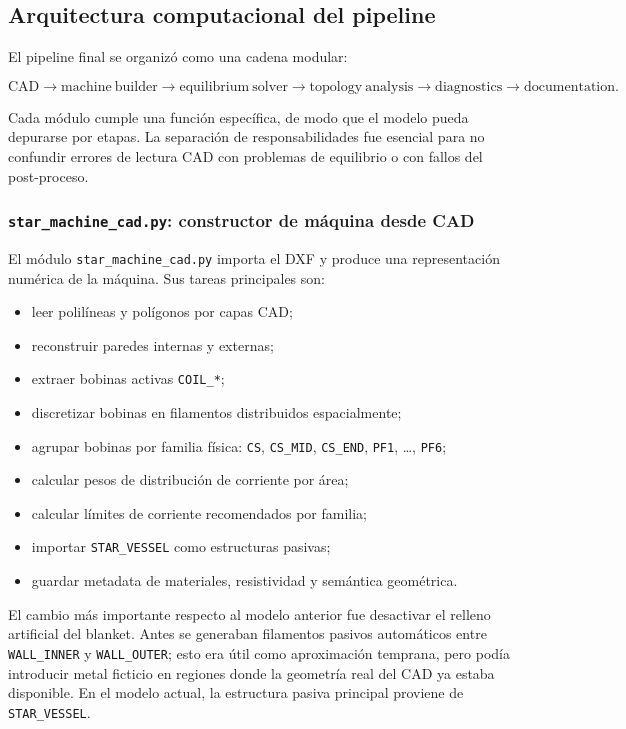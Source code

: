 \documentclass[11pt,a4paper]{article}
\begin{document}
\subsection{Arquitectura computacional del pipeline}
El pipeline final se organizó como una cadena modular:

\[
\mathrm{CAD}\rightarrow
\mathrm{machine\ builder}\rightarrow
\mathrm{equilibrium\ solver}\rightarrow
\mathrm{topology\ analysis}\rightarrow
\mathrm{diagnostics}\rightarrow
\mathrm{documentation}.
\]

Cada módulo cumple una función específica, de modo que el modelo pueda depurarse por etapas.
La separación de responsabilidades fue esencial para no confundir errores de lectura CAD con
problemas de equilibrio o con fallos del post-proceso.

\subsubsection{\texttt{star\_machine\_cad.py}: constructor de máquina desde CAD}
El módulo \texttt{star\_machine\_cad.py} importa el DXF y produce una representación numérica de
la máquina. Sus tareas principales son:

\begin{itemize}
    \item leer polilíneas y polígonos por capas CAD;
    \item reconstruir paredes internas y externas;
    \item extraer bobinas activas \texttt{COIL\_*};
    \item discretizar bobinas en filamentos distribuidos espacialmente;
    \item agrupar bobinas por familia física: \texttt{CS}, \texttt{CS\_MID}, \texttt{CS\_END},
    \texttt{PF1}, \ldots, \texttt{PF6};
    \item calcular pesos de distribución de corriente por área;
    \item calcular límites de corriente recomendados por familia;
    \item importar \texttt{STAR\_VESSEL} como estructuras pasivas;
    \item guardar metadata de materiales, resistividad y semántica geométrica.
\end{itemize}

El cambio más importante respecto al modelo anterior fue desactivar el relleno artificial del
blanket. Antes se generaban filamentos pasivos automáticos entre \texttt{WALL\_INNER} y
\texttt{WALL\_OUTER}; esto era útil como aproximación temprana, pero podía introducir metal
ficticio en regiones donde la geometría real del CAD ya estaba disponible. En el modelo actual,
la estructura pasiva principal proviene de \texttt{STAR\_VESSEL}.
\end{document}
